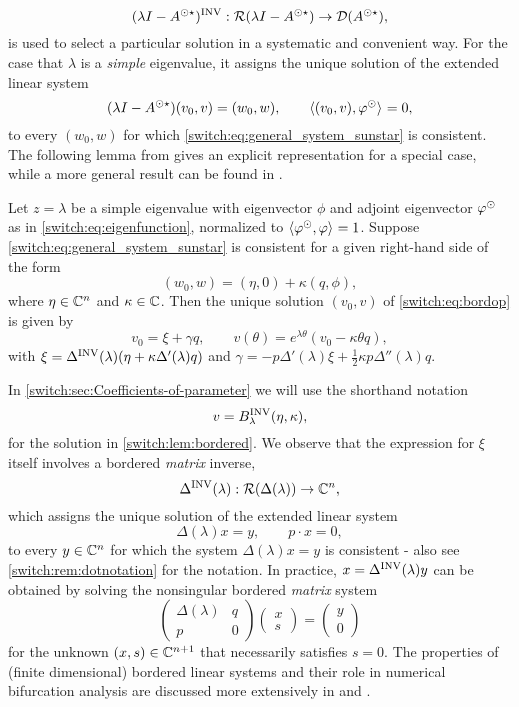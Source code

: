 \[
(\lambda I - A^{\odot\star})^{\mathrm{INV}} : \mathcal{R}(\lambda I - A^{\odot\star}) \to \mathcal{D}(A^{\odot\star}),
\]
is used to select a particular solution in a systematic and convenient way. For the case that $\lambda$ is a \emph{simple} eigenvalue, it assigns the unique solution of the extended linear system
\begin{equation}
  \label{switch:eq:bordop}
(\lambda I - A^{\odot\star})(v_0,v) = (w_0,w), \qquad \langle (v_0,v),\varphi^{\odot} \rangle_{} = 0,
\end{equation}
to every $(w_0,w)$ for which \cref{switch:eq:general_system_sunstar} is consistent. The following lemma from \cite[Corollary 3.7]{Janssens:Thesis} gives an explicit representation for a special case, while a more general result can be found in \cite[Proposition 3.6]{Janssens:Thesis}.
\begin{lemma}\label{switch:lem:bordered}
  Let $z = \lambda$ be a simple eigenvalue with eigenvector $\phi$ and adjoint eigenvector $\varphi^{\odot}$ as in \cref{switch:eq:eigenfunction}, normalized to $\langle \varphi^{\odot},\varphi \rangle_{} = 1$. Suppose \cref{switch:eq:general_system_sunstar} is consistent for a given right-hand side of the form
  \[
    (w_0,w) = (\eta,0) + \kappa (q, \phi),
  \]
  where $\eta \in \mathbb{C}^n$ and $\kappa \in \mathbb{C}$. Then the unique solution $(v_0,v)$ of \cref{switch:eq:bordop} is given by
  \[
    v_0 = \xi + \gamma q, \qquad v(\theta) = e^{\lambda\theta}(v_0 - \kappa \theta q),
  \]
  with $\xi = \Delta^{\mathrm{INV}}(\lambda)(\eta + \kappa\Delta'(\lambda)q)$ and $\gamma = -p\Delta'(\lambda)\xi + \frac{1}{2}\kappa p \Delta''(\lambda)q$.
\end{lemma}
In \cref{switch:sec:Coefficients-of-parameter} we will use the shorthand notation
\[
  v = B^{\mathrm{INV}}_{\lambda}(\eta,\kappa),
\]
for the solution in \cref{switch:lem:bordered}. We observe that the expression for $\xi$ itself involves a bordered {\em matrix} inverse,
\[
\Delta^{\mathrm{INV}}(\lambda) : \mathcal{R}(\Delta(\lambda)) \to \mathbb{C}^n,
\]
which assigns the unique solution of the extended linear system
\[
  \Delta(\lambda)x = y, \qquad p\cdot x = 0,
\]
to every $y \in \mathbb{C}^n$ for which the system $\Delta(\lambda)x = y$ is consistent - also see \cref{switch:rem:dotnotation} for the notation. In practice, $x=\Delta^{\mathrm{INV}}(\lambda)y$ can be obtained by solving the nonsingular bordered \emph{matrix} system
\[
\begin{pmatrix}
\Delta(\lambda) & q\\
p & 0
\end{pmatrix}\begin{pmatrix}
x\\
s
\end{pmatrix}=\begin{pmatrix}
y\\
0
\end{pmatrix}
\]
for the unknown $(x,s) \in \mathbb{C}^{n+1}$ that necessarily satisfies $s = 0$. The properties of (finite dimensional) bordered linear systems and their role in numerical bifurcation analysis are discussed more extensively in \cite{Keller1987Numerical} and \cite[Chapter 3]{govaerts2000numerical}.
 
